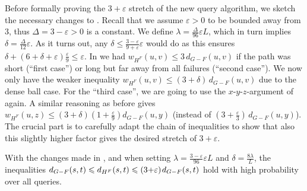 \documentclass{theoretics}
\newcommand*{\nwspace}{\hspace*{.1em}}
\renewcommand{\le}{\leqslant}
\newcommand{\eps}{\varepsilon}
\begin{document}
Before formally proving the $3+\varepsilon$ stretch of the new query algorithm,
we sketch the necessary changes to .
Recall that we assume $\varepsilon >0$ to be bounded away from $3$,
thus $\Delta = 3-\varepsilon > 0$ is a constant.
We define $\lambda =\frac{\Delta}{96} \varepsilon L$,
which in turn implies $\delta = \frac{\Delta}{12} \varepsilon$.
As it turns out, any $\delta \le \frac{3-\varepsilon}{9+\varepsilon} \varepsilon$ would do
as this ensures 
$\delta +  (6 + \delta + \varepsilon) \frac{\varepsilon}{9} \le \varepsilon$.
In  we had $w_{H^F}(u,v) \le 3\, d_{G-F}(u,v)$
if the path was short (``first case'') or long but far away from all failures (``second case'').
We now only have the weaker inequality $w_{H^F}(u,v) \le (3{+}\delta)\, d_{G-F}(u,v)$ due to the dense ball case.
For the ``third case'', we are going to use the $x$-$y$-$z$-argument of  again. 
A similar reasoning as before gives
$w_{H^F}(u,z) \le (3{+}\delta)(1{+}\frac{\varepsilon}{9}) d_{G-F}(u,y)$
(instead of $(3{+}\frac{\varepsilon}{3}) \, d_{G-F}(u,y)$).
The crucial part is to carefully adapt the chain of inequalities to show that also this slightly higher factor gives the desired stretch of $3+\varepsilon$.

\begin{lemma}
\label{lem:improved_query_correctness}
  With the changes made in , 
  and when setting $\lambda = \frac{3-\varepsilon}{96} \varepsilon L$ 
  and $\delta = \frac{8\lambda}{L}$,
  the inequalities
  $d_{G-F}(s,t) \le d_{H^F}(s,t) \le (3{+}\eps) \nwspace d_{G-F}(s,t)$
  hold with high probability over all queries.
\end{lemma}
\end{document}
